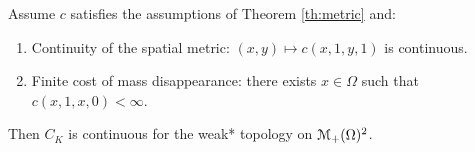 %
\begin{theorem}
	\label{th : continuity continuous static}
	Assume $c$ satisfies the assumptions of Theorem \ref{th:metric} and:
	\begin{enumerate}[{(A}1{)}]
		\item Continuity of the spatial metric: $(x,y) \mapsto c(x,1,y,1)$ is continuous. \label{asp:ContinuityContinuity}
		\item Finite cost of mass disappearance: there exists $x \in \Omega$ such that $c(x,1,x,0) < \infty$. \label{asp:ContinuityFiniteness}
	\end{enumerate}
	Then $C_K$ is continuous for the weak* topology on $\mathcal{M}_+(\Omega)^2$.
\end{theorem}
